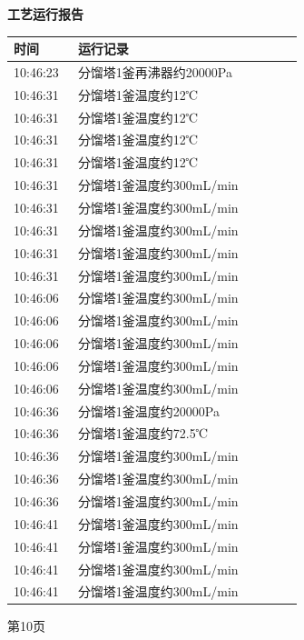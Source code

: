 \documentclass[UTF8,10pt,a4paper,fontset=fandol]{ctexart}
\begin{document}
\hfill
\begin{minipage}[t]{0.47\linewidth}
\centering
\textbf{工艺运行报告}

\vspace{2mm}
\scriptsize
\begin{tabular}{|p{0.20\linewidth}|p{0.70\linewidth}|}
\hline
时间 & 运行记录 \\ \hline
10:46:23 & 分馏塔1釜再沸器约20000Pa \\ \hline
10:46:31 & 分馏塔1釜温度约12℃ \\ \hline
10:46:31 & 分馏塔1釜温度约12℃ \\ \hline
10:46:31 & 分馏塔1釜温度约12℃ \\ \hline
10:46:31 & 分馏塔1釜温度约12℃ \\ \hline
10:46:31 & 分馏塔1釜温度约300mL/min \\ \hline
10:46:31 & 分馏塔1釜温度约300mL/min \\ \hline
10:46:31 & 分馏塔1釜温度约300mL/min \\ \hline
10:46:31 & 分馏塔1釜温度约300mL/min \\ \hline
10:46:31 & 分馏塔1釜温度约300mL/min \\ \hline
10:46:06 & 分馏塔1釜温度约300mL/min \\ \hline
10:46:06 & 分馏塔1釜温度约300mL/min \\ \hline
10:46:06 & 分馏塔1釜温度约300mL/min \\ \hline
10:46:06 & 分馏塔1釜温度约300mL/min \\ \hline
10:46:06 & 分馏塔1釜温度约300mL/min \\ \hline
10:46:36 & 分馏塔1釜温度约20000Pa \\ \hline
10:46:36 & 分馏塔1釜温度约72.5℃ \\ \hline
10:46:36 & 分馏塔1釜温度约300mL/min \\ \hline
10:46:36 & 分馏塔1釜温度约300mL/min \\ \hline
10:46:36 & 分馏塔1釜温度约300mL/min \\ \hline
10:46:41 & 分馏塔1釜温度约300mL/min \\ \hline
10:46:41 & 分馏塔1釜温度约300mL/min \\ \hline
10:46:41 & 分馏塔1釜温度约300mL/min \\ \hline
10:46:41 & 分馏塔1釜温度约300mL/min \\ \hline
\end{tabular}

\vspace{1mm}

第10页
\end{minipage}
\end{document}
